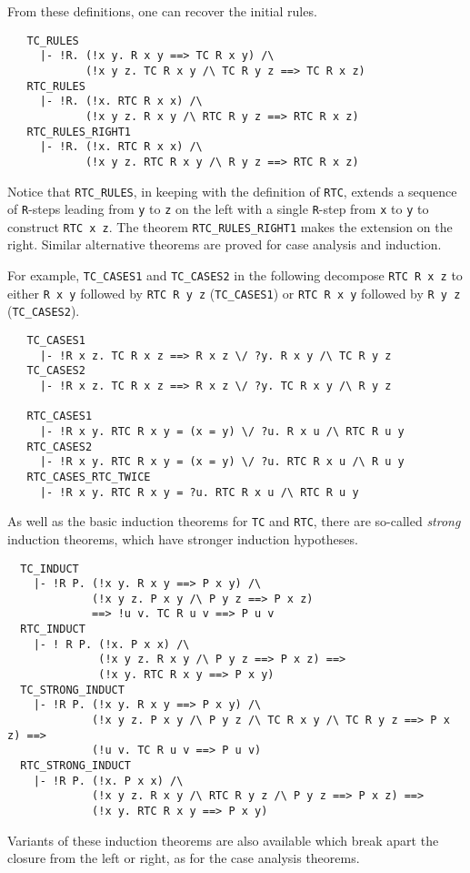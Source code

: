 \noindent
From these definitions, one can recover the initial rules.
%
\begin{hol}
{\small
\begin{verbatim}
   TC_RULES
     |- !R. (!x y. R x y ==> TC R x y) /\
            (!x y z. TC R x y /\ TC R y z ==> TC R x z)
   RTC_RULES
     |- !R. (!x. RTC R x x) /\
            (!x y z. R x y /\ RTC R y z ==> RTC R x z)
   RTC_RULES_RIGHT1
     |- !R. (!x. RTC R x x) /\
            (!x y z. RTC R x y /\ R y z ==> RTC R x z)
\end{verbatim}
}
\end{hol}
%
Notice that {\small\verb+RTC_RULES+}, in keeping with the definition
of {\small\verb+RTC+}, extends a sequence of \verb+R+-steps leading
from \verb+y+ to \verb+z+ on the left with a single \verb+R+-step from
\verb+x+ to \verb+y+ to construct \verb+RTC x z+. The theorem
{\small\verb+RTC_RULES_RIGHT1+} makes the extension on the right.
Similar alternative theorems are proved for case analysis and induction.

For example, {\small\verb+TC_CASES1+} and {\small\verb+TC_CASES2+} in the
following decompose {\small\verb+RTC R x z+} to either
{\small\verb+R x y+} followed by {\small\verb+RTC R y z+}
({\small\verb+TC_CASES1+})
or
{\small\verb+RTC R x y+} followed by {\small\verb+R y z+}
({\small\verb+TC_CASES2+}).

%
\begin{hol}
{\small
\begin{verbatim}
   TC_CASES1
     |- !R x z. TC R x z ==> R x z \/ ?y. R x y /\ TC R y z
   TC_CASES2
     |- !R x z. TC R x z ==> R x z \/ ?y. TC R x y /\ R y z

   RTC_CASES1
     |- !R x y. RTC R x y = (x = y) \/ ?u. R x u /\ RTC R u y
   RTC_CASES2
     |- !R x y. RTC R x y = (x = y) \/ ?u. RTC R x u /\ R u y
   RTC_CASES_RTC_TWICE
     |- !R x y. RTC R x y = ?u. RTC R x u /\ RTC R u y
\end{verbatim}
}
\end{hol}

As well as the basic induction theorems for {\small\verb+TC+} and
{\small\verb+RTC+}, there are so-called \emph{strong} induction
theorems, which have stronger induction hypotheses.
%
\begin{hol}
{\small
\begin{verbatim}
  TC_INDUCT
    |- !R P. (!x y. R x y ==> P x y) /\
             (!x y z. P x y /\ P y z ==> P x z)
             ==> !u v. TC R u v ==> P u v
  RTC_INDUCT
    |- ! R P. (!x. P x x) /\
              (!x y z. R x y /\ P y z ==> P x z) ==>
              (!x y. RTC R x y ==> P x y)
  TC_STRONG_INDUCT
    |- !R P. (!x y. R x y ==> P x y) /\
             (!x y z. P x y /\ P y z /\ TC R x y /\ TC R y z ==> P x z) ==>
             (!u v. TC R u v ==> P u v)
  RTC_STRONG_INDUCT
    |- !R P. (!x. P x x) /\
             (!x y z. R x y /\ RTC R y z /\ P y z ==> P x z) ==>
             (!x y. RTC R x y ==> P x y)
\end{verbatim}
}
\end{hol}
Variants of these induction theorems are also available which break
apart the closure from the left or right, as for the case analysis theorems.

